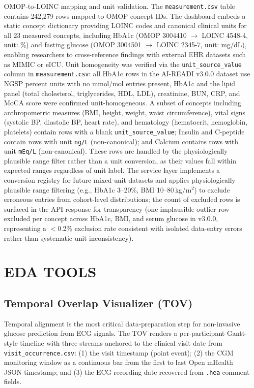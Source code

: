 \documentclass[conference]{IEEEtran}
\begin{document}
OMOP-to-LOINC mapping and unit validation. The \texttt{measurement.csv} table \cite{noauthor_omop_nodate} contains 242,279 rows mapped to OMOP concept IDs. The dashboard embeds a static concept dictionary providing LOINC codes and canonical clinical units for all 23 measured concepts, including HbA1c (OMOP 3004410 $\to$ LOINC 4548-4, unit: \%) and fasting glucose (OMOP 3004501 $\to$ LOINC 2345-7, unit: mg/dL), enabling researchers to cross-reference findings with external EHR datasets such as MIMIC or eICU. Unit homogeneity was verified via the \texttt{unit\_source\_value} column in \texttt{measurement.csv}: all HbA1c rows in the AI-READI v3.0.0 dataset use NGSP percent units with no mmol/mol entries present, HbA1c and the lipid panel (total cholesterol, triglycerides, HDL, LDL),  creatinine, BUN, CRP, and MoCA score were confirmed unit-homogeneous.  A subset of concepts including anthropometric measures (BMI, height, weight,  waist circumference), vital signs (systolic BP, diastolic BP, heart rate), and hematology (hematocrit, hemoglobin, platelets) contain rows with a blank \texttt{unit\_source\_value}; Insulin and C-peptide contain rows with unit \texttt{ng/L} (non-canonical); and Calcium contains rows with unit \texttt{mEq/L} (non-canonical). These rows are handled by the physiologically plausible range filter rather than a unit conversion, as their values fall within expected ranges regardless of unit label. The service layer implements a conversion registry for future mixed-unit datasets and applies physiologically plausible range filtering (e.g., HbA1c 3--20\%, BMI 10--80\,kg/m$^2$) to exclude erroneous entries from cohort-level distributions; the count of excluded rows is surfaced in the API response for transparency (one implausible outlier row excluded per concept across HbA1c, BMI, and serum glucose in v3.0.0, representing a $<$0.2\% exclusion rate consistent with isolated data-entry errors rather than systematic unit inconsistency).

\section{EDA TOOLS}
\label{sec:eda}

\subsection{Temporal Overlap Visualizer (TOV)}
\label{sec:temporal_overlap_visualizer}
Temporal alignment is the most critical data-preparation step for non-invasive glucose prediction from ECG signals. The TOV renders a per-participant Gantt-style timeline with three streams anchored to the clinical visit date from \texttt{visit\_occurrence.csv}: (1) the visit timestamp (point event); (2) the CGM monitoring window as a continuous bar from the first to last Open mHealth JSON timestamp; and (3) the ECG recording date recovered from \texttt{.hea} comment fields.
\end{document}
